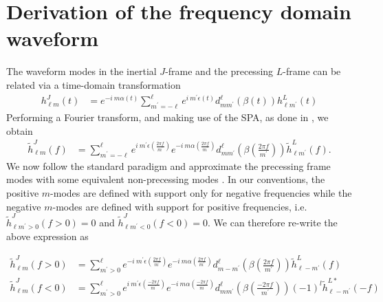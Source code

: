 \documentclass[%
aps,
prd,
amssymb,
amsmath,
amsfonts,
eqsecnum,
showpacs,
nofootinbib,
floatfix,
twocolumn,
twoside,
a4paper,
superscriptaddress
]{revtex4-1}
\newcommand{\nl}{\newline}
\begin{document}
\section{Derivation of the frequency domain waveform}
\label{appendix:derivation}

The waveform modes in the inertial $J$-frame and the precessing $L$-frame can be related via a time-domain transformation
\begin{align}
\label{eq:twisting_td}
    h^{J}_{\ell m}(t) &= e^{-i\:m \alpha(t)} \sum_{m^{\prime}=-\ell}^{\ell} e^{i\:m^{\prime}\epsilon(t)} d^{\ell}_{m m^{\prime}}(\beta(t))h_{\ell m^{\prime}}^{L}(t)
\end{align}
Performing a Fourier transform, and making use of the SPA, as done in \cite{Bohe:PPv2}, we obtain
\begin{align}
\label{eq:twisting_fd}
    \tilde{h}^{J}_{\ell m}(f) &=  \sum_{m^{\prime}=-\ell}^\ell  e^{i\:m^{\prime}\epsilon \left(\frac{2\pi f}{m^{\prime}} \right)} e^{-i\:m \alpha \left(\frac{2\pi f}{m^{\prime}} \right)} d^{\ell}_{m m^{\prime}} \left(\beta\left(\frac{2\pi f}{m^{\prime}}\right)\right) \tilde{h}_{\ell m^{\prime}}^{L}(f) .
\end{align}
We now follow the standard paradigm and approximate the precessing frame modes with some equivalent non-precessing modes \cite{Schmidt:2010it,Schmidt:2012rh,Hannam:2013oca}. In our conventions, the positive $m$-modes are defined with support only for negative frequencies while the negative $m$-modes are defined with support for positive frequencies, i.e. $\tilde{h}_{\ell m^{\prime}>0}^{J}(f>0) = 0$ and $\tilde{h}_{\ell m^{\prime}<0}^{J}(f<0) = 0$. We can therefore re-write the above expression as 
\begin{widetext}
\begin{align}
\label{eq:twisting_fd_split}
    \tilde{h}^{J}_{\ell m}(f>0) &=  \sum_{m^{\prime}>0 }^{\ell } e^{-i\:m^{\prime}\epsilon \left(\frac{2\pi f}{m^{\prime}} \right)} e^{-i\:m \alpha \left(\frac{2\pi f}{m^{\prime}} \right)} d^{\ell}_{m -m^{\prime}} \left(\beta\left(\frac{2\pi f}{m^{\prime}}\right)\right) \tilde{h}_{\ell -m^{\prime}}^{L}(f)
    \\
    \tilde{h}^{J}_{\ell  m}(f<0) &=  \sum_{m^{\prime}>0 }^{\ell}  e^{i\:m^{\prime}\epsilon \left(\frac{-2\pi f}{m^{\prime}} \right)} e^{-i\:m \alpha \left(\frac{-2\pi f}{m^{\prime}} \right)} d^{\ell}_{m m^{\prime}} \left(\beta\left(\frac{-2\pi f}{m^{\prime}}\right)\right) (-1)^l\tilde{h}_{\ell -m^{\prime}}^{L*}(-f)
\end{align}
\end{widetext}
\end{document}
